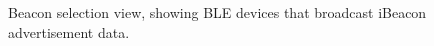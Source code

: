 \begin{figure}[h!]
    \centering
    \begin{minipage}{0.41\textwidth}
        \centering
        \caption{Beacon selection view, showing BLE devices that broadcast iBeacon advertisement data.}

\end{minipage}
\end{figure}
